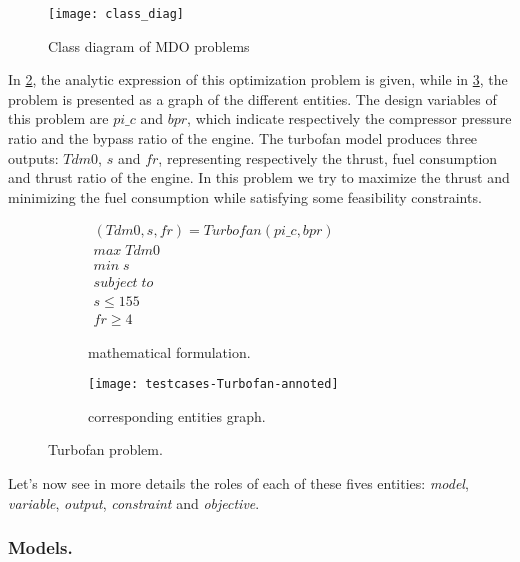 \begin{figure}[t]
	\centering
	\texttt{[image: class\_diag]}
	\caption{Class diagram of MDO problems}
	\label{class_diag}
\end{figure}

In \figurename{} \ref{turbofan:math}, the analytic expression of this optimization problem is given, while in \figurename{} \ref{turbofan:graph}, the problem is presented as a graph of the different entities. The design variables of this problem are $pi\_c$ and $bpr$, which indicate respectively the compressor pressure ratio and the bypass ratio of the engine. The turbofan model produces three outputs: $Tdm0$, $s$ and $fr$, representing respectively the thrust, fuel consumption and thrust ratio of the engine. In this problem we try to maximize the thrust and minimizing the fuel consumption while satisfying some feasibility constraints. 

\begin{figure}[]
\centering
	\begin{subfigure}[b]{0.4\textwidth}
		$\begin{array}{c}
			(Tdm0, s, fr) = Turbofan(pi\_c, bpr) \\
			max \; Tdm0 \\
			min \; s \\
			subject \; to \\
			s \leq 155 \\
			fr \geq 4
		\end{array}$
		\caption{mathematical formulation.}\label{turbofan:math}
	\end{subfigure}
	\hfill%
	\begin{subfigure}[b]{0.55\textwidth}
			\centering
			\texttt{[image: testcases-Turbofan-annoted]}
			\caption{corresponding entities graph.}\label{turbofan:graph}
	\end{subfigure}

\caption{Turbofan problem.}
\label{turbofan}

\end{figure}

Let's now see in more details the roles of each of these fives entities: \emph{model}, \emph{variable}, \emph{output}, \emph{constraint} and \emph{objective}.

\subsubsection*{Models.}

